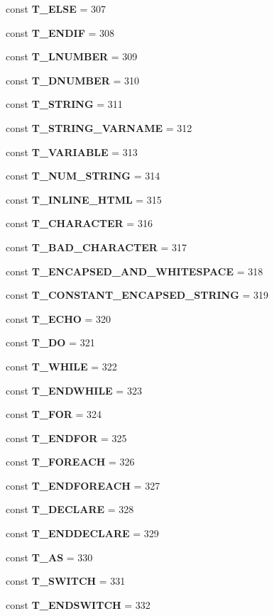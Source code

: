 \begin{DoxyCompactItemize}
\item 
const {\bf T\+\_\+\+E\+L\+S\+E} = 307
\item 
const {\bf T\+\_\+\+E\+N\+D\+I\+F} = 308
\item 
const {\bf T\+\_\+\+L\+N\+U\+M\+B\+E\+R} = 309
\item 
const {\bf T\+\_\+\+D\+N\+U\+M\+B\+E\+R} = 310
\item 
const {\bf T\+\_\+\+S\+T\+R\+I\+N\+G} = 311
\item 
const {\bf T\+\_\+\+S\+T\+R\+I\+N\+G\+\_\+\+V\+A\+R\+N\+A\+M\+E} = 312
\item 
const {\bf T\+\_\+\+V\+A\+R\+I\+A\+B\+L\+E} = 313
\item 
const {\bf T\+\_\+\+N\+U\+M\+\_\+\+S\+T\+R\+I\+N\+G} = 314
\item 
const {\bf T\+\_\+\+I\+N\+L\+I\+N\+E\+\_\+\+H\+T\+M\+L} = 315
\item 
const {\bf T\+\_\+\+C\+H\+A\+R\+A\+C\+T\+E\+R} = 316
\item 
const {\bf T\+\_\+\+B\+A\+D\+\_\+\+C\+H\+A\+R\+A\+C\+T\+E\+R} = 317
\item 
const {\bf T\+\_\+\+E\+N\+C\+A\+P\+S\+E\+D\+\_\+\+A\+N\+D\+\_\+\+W\+H\+I\+T\+E\+S\+P\+A\+C\+E} = 318
\item 
const {\bf T\+\_\+\+C\+O\+N\+S\+T\+A\+N\+T\+\_\+\+E\+N\+C\+A\+P\+S\+E\+D\+\_\+\+S\+T\+R\+I\+N\+G} = 319
\item 
const {\bf T\+\_\+\+E\+C\+H\+O} = 320
\item 
const {\bf T\+\_\+\+D\+O} = 321
\item 
const {\bf T\+\_\+\+W\+H\+I\+L\+E} = 322
\item 
const {\bf T\+\_\+\+E\+N\+D\+W\+H\+I\+L\+E} = 323
\item 
const {\bf T\+\_\+\+F\+O\+R} = 324
\item 
const {\bf T\+\_\+\+E\+N\+D\+F\+O\+R} = 325
\item 
const {\bf T\+\_\+\+F\+O\+R\+E\+A\+C\+H} = 326
\item 
const {\bf T\+\_\+\+E\+N\+D\+F\+O\+R\+E\+A\+C\+H} = 327
\item 
const {\bf T\+\_\+\+D\+E\+C\+L\+A\+R\+E} = 328
\item 
const {\bf T\+\_\+\+E\+N\+D\+D\+E\+C\+L\+A\+R\+E} = 329
\item 
const {\bf T\+\_\+\+A\+S} = 330
\item 
const {\bf T\+\_\+\+S\+W\+I\+T\+C\+H} = 331
\item 
const {\bf T\+\_\+\+E\+N\+D\+S\+W\+I\+T\+C\+H} = 332
\item 

\end{DoxyCompactItemize}
